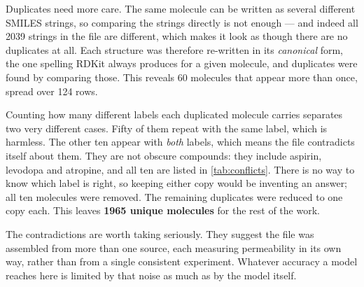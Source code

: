 Duplicates need more care. The same molecule can be written as several different SMILES strings, so comparing the strings directly is not enough --- and indeed all 2039 strings in the file are different, which makes it look as though there are no duplicates at all. Each structure was therefore re-written in its \emph{canonical} form, the one spelling RDKit always produces for a given molecule, and duplicates were found by comparing those. This reveals 60 molecules that appear more than once, spread over 124 rows.

Counting how many different labels each duplicated molecule carries separates two very different cases. Fifty of them repeat with the same label, which is harmless. The other ten appear with \emph{both} labels, which means the file contradicts itself about them. They are not obscure compounds: they include aspirin, levodopa and atropine, and all ten are listed in \cref{tab:conflicts}. There is no way to know which label is right, so keeping either copy would be inventing an answer; all ten molecules were removed. The remaining duplicates were reduced to one copy each. This leaves \textbf{1965 unique molecules} for the rest of the work.

The contradictions are worth taking seriously. They suggest the file was assembled from more than one source, each measuring permeability in its own way, rather than from a single consistent experiment. Whatever accuracy a model reaches here is limited by that noise as much as by the model itself.
